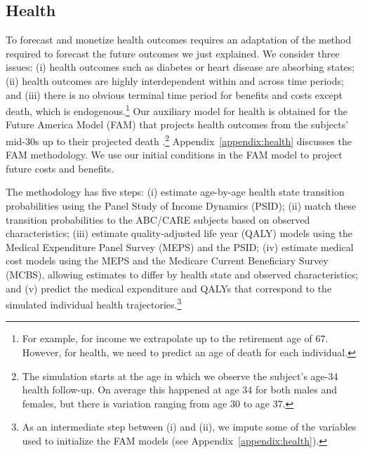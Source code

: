 \subsection{Health} \label{section:health}

To forecast and monetize health outcomes requires an adaptation of the method required to forecast the future outcomes we just explained. We consider three issues: (i) health outcomes such as diabetes or heart disease are absorbing states; (ii) health outcomes are highly interdependent within and across time periods; and (iii) there is no obvious terminal time period for benefits and costs except death, which is endogenous.\footnote{For example, for income we extrapolate up to the retirement age of 67. However, for health, we need to predict an age of death for each individual.} Our auxiliary model for health is obtained for the Future America Model (FAM) that projects health outcomes from the subjects' mid-30s up to their projected death \citep{Goldman_etal_2015_Future-Elderly-Model-Report}.\footnote{The simulation starts at the age in which we observe the subject's age-34 health follow-up. On average this happened at age 34 for both males and females, but there is variation ranging from age 30 to age 37.} Appendix~\ref{appendix:health} discusses the FAM methodology. We use our initial conditions in the FAM model to project future costs and benefits.

The methodology has five steps: (i) estimate age-by-age health state transition probabilities using the Panel Study of Income Dynamics (PSID); (ii) match these transition probabilities to the ABC/CARE subjects based on observed characteristics; (iii) estimate quality-adjusted life year (QALY) models using the Medical Expenditure Panel Survey (MEPS) and the PSID; (iv) estimate medical cost models using the MEPS and the Medicare Current Beneficiary Survey (MCBS), allowing estimates to differ by health state and observed characteristics; and (v) predict the medical expenditure and QALYs that correspond to the simulated individual health trajectories.\footnote{As an intermediate step between (i) and (ii), we impute some of the variables used to initialize the FAM models (see Appendix~\ref{appendix:health}).}


